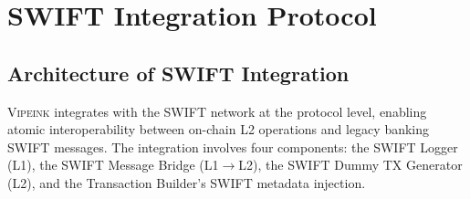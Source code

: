 \documentclass[12pt,a4paper]{article}
\theoremstyle{definition}
\theoremstyle{remark}
\newcommand{\Vipeink}{\textsc{Vipeink}}
\begin{document}
\section{SWIFT Integration Protocol}
\label{sec:swift-integration}

\subsection{Architecture of SWIFT Integration}

\Vipeink{} integrates with the SWIFT network at the protocol level, enabling atomic interoperability between on-chain L2 operations and legacy banking SWIFT messages. The integration involves four components: the SWIFT Logger (L1), the SWIFT Message Bridge (L1$\to$L2), the SWIFT Dummy TX Generator (L2), and the Transaction Builder's SWIFT metadata injection.
\end{document}
